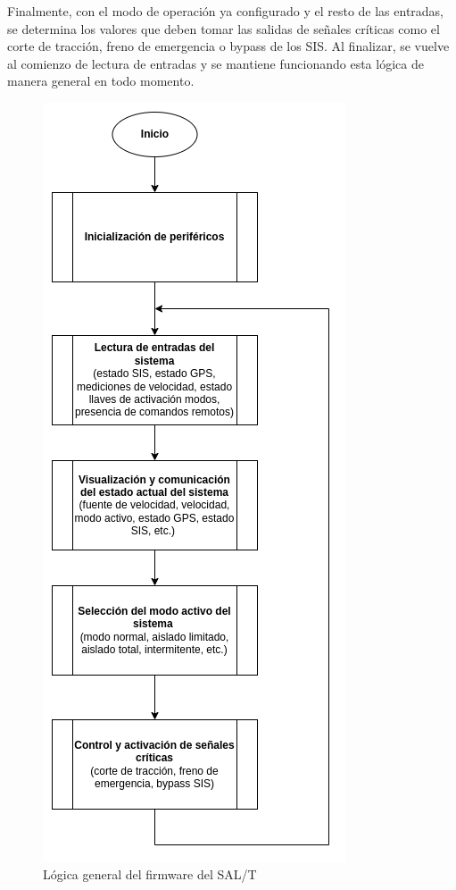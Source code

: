 Finalmente, con el modo de operación ya configurado y el resto de las entradas, se determina los valores que deben tomar las salidas de señales críticas como el corte de tracción, freno de emergencia o bypass de los SIS. Al finalizar, se vuelve al comienzo de lectura de entradas y se mantiene funcionando esta lógica de manera general en todo momento. 


\begin{figure}[H]
    \centering
    \includegraphics[scale = 0.6]{img/logica_firmware.png}    
    \caption{Lógica general del firmware del SAL/T}
    \label{fig:logica_firmware}
\end{figure}    




